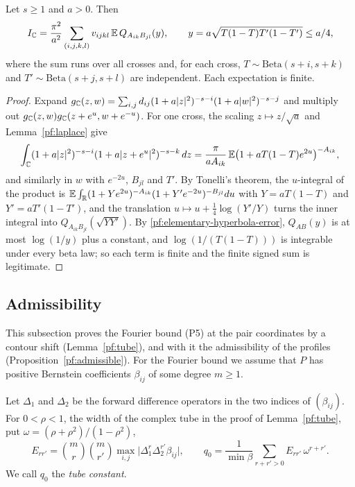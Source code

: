 \begin{lemma}\label{pf:pair-reduction}
Let $s\ge1$ and $a>0$. Then
\[
 I_\mathbb C=\frac{\pi^2}{a^2}\sum_{(i,j,k,l)}v_{ijkl}\,
 \mathbb E\,Q_{A_{ik}B_{jl}}(y),\qquad
 y=a\sqrt{T(1-T)T'(1-T')}\le a/4,
\]
where the sum runs over all crosses and, for each cross,
$T\sim\mathrm{Beta}(s+i,s+k)$ and $T'\sim\mathrm{Beta}(s+j,s+l)$ are
independent. Each expectation is finite.
\end{lemma}

\begin{proof}
Expand $g_\mathbb C(z,w)=\sum_{i,j}d_{ij}(1+a|z|^2)^{-s-i}(1+a|w|^2)^{-s-j}$ and
multiply out $g_\mathbb C(z,w)g_\mathbb C(z+e^u,w+e^{-u})$. For one cross, the scaling
$z\mapsto z/\sqrt a$ and Lemma~\ref{pf:laplace} give
\[
 \int_\mathbb C(1+a|z|^2)^{-s-i}(1+a|z+e^u|^2)^{-s-k}\,dz
 =\frac\pi{aA_{ik}}\,\mathbb E\bigl(1+aT(1-T)e^{2u}\bigr)^{-A_{ik}},
\]
and similarly in $w$ with $e^{-2u}$, $B_{jl}$ and $T'$. By Tonelli's
theorem, the $u$-integral of the product is
$\mathbb E\int_\mathbb R(1+Ye^{2u})^{-A_{ik}}(1+Y'e^{-2u})^{-B_{jl}}du$ with
$Y=aT(1-T)$ and $Y'=aT'(1-T')$, and the translation
$u\mapsto u+\frac14\log(Y'/Y)$ turns the inner integral into
$Q_{A_{ik}B_{jl}}(\sqrt{YY'})$. By
\eqref{pf:elementary-hyperbola-error}, $Q_{AB}(y)$ is at most
$\log(1/y)$ plus a constant, and $\log(1/(T(1-T)))$ is integrable under
every beta law; so each term is finite and the finite signed sum is
legitimate.
\end{proof}

\subsection{Admissibility}

This subsection proves the Fourier bound (P5) at the pair coordinates by a
contour shift (Lemma~\ref{pf:tube}), and with it the admissibility of the
profiles (Proposition~\ref{pf:admissible}). For the Fourier bound we assume that $P$ has positive Bernstein
coefficients $\beta_{ij}$ of some degree $m\ge1$.

\begin{definition}\label{pf:tube-constant}
Let $\Delta_1$ and $\Delta_2$ be the forward difference operators in
the two indices of $(\beta_{ij})$. For $0<\rho<1$, the width of the
complex tube in the proof of Lemma~\ref{pf:tube}, put
$\omega=(\rho+\rho^2)/(1-\rho^2)$,
\[
 E_{rr'}=\binom mr\binom m{r'}\max_{i,j}\bigl|\Delta_1^r\Delta_2^{r'}
 \beta_{ij}\bigr|,\qquad
 q_0=\frac1{\min\beta}\sum_{r+r'>0}E_{rr'}\,\omega^{r+r'} .
\]
We call $q_0$ the \emph{tube constant}.
\end{definition}

